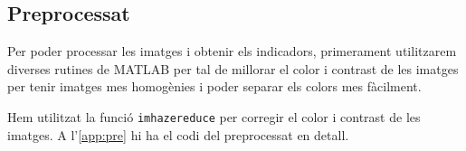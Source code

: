 
%




\subsection{Preprocessat}

Per poder processar les imatges i obtenir els indicadors, primerament utilitzarem
diverses rutines de MATLAB per tal de millorar el color i contrast de les imatges per tenir
imatges mes homogènies i poder separar els colors mes fàcilment.

Hem utilitzat la funció \texttt{imhazereduce} per corregir el color i contrast de les imatges.
A l'\cref{app:pre} hi ha el codi del preprocessat en detall.
